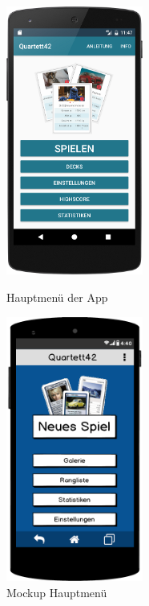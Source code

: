 \begin{figure}[h]
    \centering
    \begin{minipage}{0.49\textwidth}
        \centering
        \includegraphics[width=0.4\textwidth]{img/screenshots/device_main_screen.png}
        \caption{Hauptmenü der App}
		\label{figure:implementierungmenue}
    \end{minipage}
    \begin{minipage}{0.49\textwidth}
        \centering
        \includegraphics[width=0.4\textwidth]{img/mockups/main_screen.png}
        \caption{Mockup Hauptmenü}
    \end{minipage}
\end{figure}



